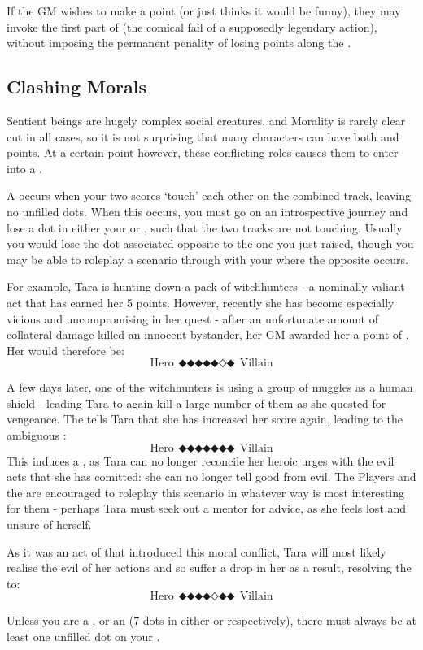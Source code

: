 If the GM wishes to make a point (or just thinks it would be funny), they may invoke the first part of  (the comical fail of a supposedly legendary action), without imposing the permanent penality of losing points along the .

\subsection{Clashing Morals}

Sentient beings are hugely complex social creatures, and Morality is rarely clear cut in all cases, so it is not surprising that many characters can have both  and  points. At a certain point however, these conflicting roles causes them to enter into a . 

A  occurs when your two scores `touch' each other on the combined track, leaving no unfilled dots. When this occurs, you must go on an introspective journey and lose a dot in either your  or , such that the two tracks are not touching. Usually you would lose the dot associated opposite to the one you just raised, though you may be able to roleplay a scenario through with your  where the opposite occurs. 

For example, Tara is hunting down a pack of witchhunters - a nominally valiant act that has earned her 5  points. However, recently she has become especially vicious and uncompromising in her quest - after an unfortunate amount of collateral damage killed an innocent bystander, her GM awarded her a point of . Her  would therefore be:
$$ \text{Hero}~~\mdblkdiamond\mdblkdiamond\mdblkdiamond\mdblkdiamond\mdblkdiamond\mdwhtdiamond\mdblkdiamond~~\text{Villain}$$

A few days later, one of the witchhunters is using a group of muggles as a human shield - leading Tara to again kill a large number of them as she quested for vengeance. The  tells Tara that she has increased her  score again, leading to the ambiguous :
$$ \text{Hero}~~\mdblkdiamond\mdblkdiamond\mdblkdiamond\mdblkdiamond\mdblkdiamond\mdblkdiamond\mdblkdiamond~~\text{Villain}$$
This induces a , as Tara can no longer reconcile her heroic urges with the evil acts that she has comitted: she can no longer tell good from evil. The Players and the  are encouraged to roleplay this scenario in whatever way is most interesting for them - perhaps Tara must seek out a mentor for advice, as she feels lost and unsure of herself. 

As it was an act of  that introduced this moral conflict, Tara will most likely realise the evil of her actions and so suffer a drop in her  as a result, resolving the  to:
$$ \text{Hero}~~\mdblkdiamond\mdblkdiamond\mdblkdiamond\mdblkdiamond\mdwhtdiamond\mdblkdiamond\mdblkdiamond~~\text{Villain}$$

Unless you are a , or an  (7 dots in either  or  respectively), there must always be at least one unfilled dot on your . 
